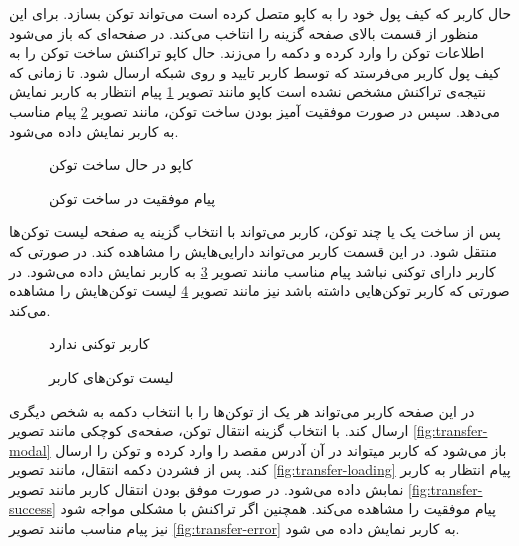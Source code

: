 حال کاربر که کیف پول خود را به کاپو متصل کرده است می‌تواند توکن بسازد.
برای این منظور از قسمت بالای صفحه گزینه
را انتاخب می‌کند.
در صفحه‌ای که باز می‌شود اطلاعات توکن را وارد کرده و دکمه
را می‌زند.
حال کاپو تراکنش ساخت توکن را به کیف پول کاربر می‌فرستد که توسط کاربر تایید و روی شبکه ارسال شود.
تا زمانی که نتیجه‌ی تراکنش مشخص نشده است کاپو مانند تصویر
\ref{fig:mint-loading}
پیام انتظار به کاربر نمایش می‌دهد.
سپس در صورت موفقیت آمیز بودن ساخت توکن، مانند تصویر
\ref{fig:mint-success}
پیام مناسب به کاربر نمایش داده می‌شود.

\begin{figure}
\centerline{}
\caption{کاپو در حال ساخت توکن}
\label{fig:mint-loading}
\end{figure}

\begin{figure}
\centerline{}
\caption{پیام موفقیت در ساخت توکن}
\label{fig:mint-success}
\end{figure}

پس از ساخت یک یا چند توکن، کاربر می‌تواند با انتخاب گزینه
یه صفحه لیست توکن‌ها منتقل شود.
در این قسمت کاربر می‌تواند دارایی‌هایش را مشاهده کند.
در صورتی که کاربر دارای توکنی نباشد پیام مناسب مانند تصویر
\ref{fig:no-tokens-yet}
به کاربر نمایش داده می‌شود.
در صورتی که کاربر توکن‌هایی داشته باشد نیز مانند تصویر
\ref{fig:tokens-list}
لیست توکن‌هایش را مشاهده می‌کند.


\begin{figure}
\centerline{}
\caption{کاربر توکنی ندارد}
\label{fig:no-tokens-yet}
\end{figure}

\begin{figure}
\centerline{}
\caption{لیست توکن‌های کاربر}
\label{fig:tokens-list}
\end{figure}

در این صفحه کاربر می‌تواند هر یک از توکن‌ها را با انتخاب دکمه
به شخص دیگری ارسال کند.
با انتخاب گزینه انتقال توکن،
صفحه‌ی کوچکی مانند تصویر
\ref{fig:transfer-modal}
باز می‌شود که کاربر میتواند در آن آدرس مقصد را وارد کرده و توکن را ارسال کند.
پس از فشردن دکمه انتقال، مانند تصویر
\ref{fig:transfer-loading}
پیام انتظار به کاربر نمابش داده می‌شود.
در صورت موفق بودن انتقال کاربر مانند تصویر
\ref{fig:transfer-success}
پیام موفقیت را مشاهده می‌کند.
همچنین اگر تراکنش با مشکلی مواجه شود نیز پیام مناسب مانند تصویر
\ref{fig:transfer-error}
به کاربر نمایش داده می شود.

